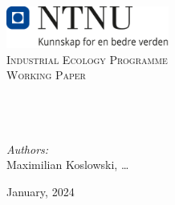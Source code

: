 
\begin{titlepage}
\vbox{ }
\vbox{ }
\begin{center}
\includegraphics[width=0.40\textwidth]{Images/NTNU_logo.png}\\[1cm]
\textsc{\LARGE Industrial Ecology Programme}\\[1.5cm]
\textsc{\Large Working Paper}\\[0.5cm]
\vbox{ }

\HRule \\[0.8cm]
{ \centering \huge \bfseries
\multiTitle
}\\[0.8cm]
\HRule \\[1.5cm]

\large
\emph{Authors:}\\
Maximilian Koslowski, \dots
\vfill

{\large January, 2024}
\end{center}
\end{titlepage}